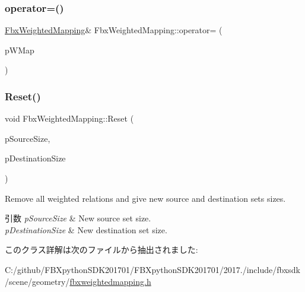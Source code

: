 \subsubsection{\texorpdfstring{operator=()}{operator=()}}
{\footnotesize\ttfamily \hyperlink{class_fbx_weighted_mapping}{Fbx\+Weighted\+Mapping}\& Fbx\+Weighted\+Mapping\+::operator= (\begin{DoxyParamCaption}\item[{const \hyperlink{class_fbx_weighted_mapping}{Fbx\+Weighted\+Mapping} \&}]{p\+W\+Map }\end{DoxyParamCaption})}

\mbox{\label{class_fbx_weighted_mapping_ae0bba66321c38e91d5910cfb0306dc57}} 
\subsubsection{\texorpdfstring{Reset()}{Reset()}}
{\footnotesize\ttfamily void Fbx\+Weighted\+Mapping\+::\+Reset (\begin{DoxyParamCaption}\item[{int}]{p\+Source\+Size,  }\item[{int}]{p\+Destination\+Size }\end{DoxyParamCaption})}

Remove all weighted relations and give new source and destination sets sizes. 
\begin{DoxyParams}{引数}
{\em p\+Source\+Size} & New source set size. \\
\hline
{\em p\+Destination\+Size} & New destination set size. \\
\hline
\end{DoxyParams}


このクラス詳解は次のファイルから抽出されました\+:\begin{DoxyCompactItemize}
\item 
C\+:/github/\+F\+B\+Xpython\+S\+D\+K201701/\+F\+B\+Xpython\+S\+D\+K201701/2017./include/fbxsdk/scene/geometry/\hyperlink{fbxweightedmapping_8h}{fbxweightedmapping.\+h}\end{DoxyCompactItemize}
